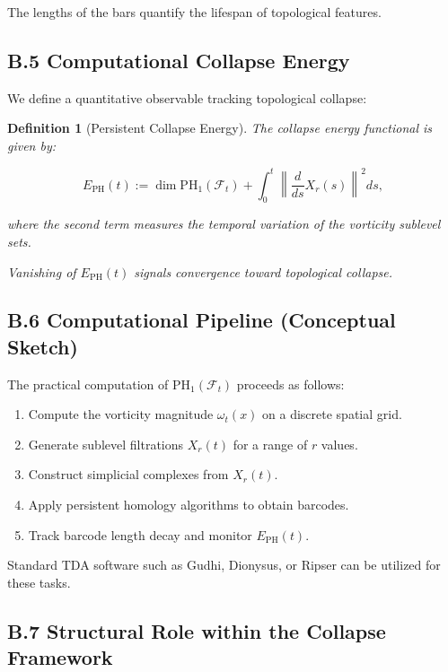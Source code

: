 \documentclass[11pt]{article}
\newtheorem{definition}[theorem]{Definition}
\begin{document}
The lengths of the bars quantify the lifespan of topological features.

\subsection*{B.5 Computational Collapse Energy}

We define a quantitative observable tracking topological collapse:

\begin{definition}[Persistent Collapse Energy]
The collapse energy functional is given by:

\[
E_{\mathrm{PH}}(t) := \dim \mathrm{PH}_1(\mathcal{F}_t) + \int_0^t \left\| \frac{d}{ds} X_r(s) \right\|^2 ds,
\]

where the second term measures the temporal variation of the vorticity sublevel sets.

Vanishing of \( E_{\mathrm{PH}}(t) \) signals convergence toward topological collapse.
\end{definition}

\subsection*{B.6 Computational Pipeline (Conceptual Sketch)}

The practical computation of \( \mathrm{PH}_1(\mathcal{F}_t) \) proceeds as follows:

\begin{enumerate}
  \item Compute the vorticity magnitude \( \omega_t(x) \) on a discrete spatial grid.
  \item Generate sublevel filtrations \( X_r(t) \) for a range of \( r \) values.
  \item Construct simplicial complexes from \( X_r(t) \).
  \item Apply persistent homology algorithms to obtain barcodes.
  \item Track barcode length decay and monitor \( E_{\mathrm{PH}}(t) \).
\end{enumerate}

Standard TDA software such as Gudhi, Dionysus, or Ripser can be utilized for these tasks.

\subsection*{B.7 Structural Role within the Collapse Framework}
\end{document}

